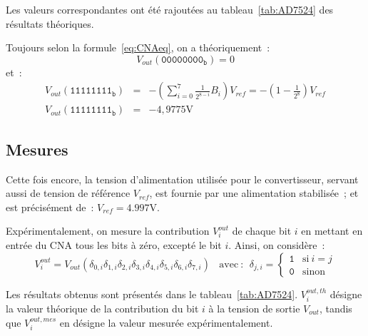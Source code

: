 \documentclass{article}
\begin{document}
Les valeurs correspondantes ont été rajoutées au tableau~\ref{tab:AD7524} des résultats théoriques.


Toujours selon la formule~\ref{eq:CNAeq}, on a théoriquement~:
\begin{equation*}
V_{out}(\mathtt{00000000_b}) = 0
\end{equation*}
et~:
\begin{eqnarray*}
V_{out}(\mathtt{11111111_b}) &=& -\left(\sum_{i=0}^{7}\frac{1}{2^{8-i}}B_i\right)V_{ref} = -(1-\frac{1}{2^8})V_{ref}\\
V_{out}(\mathtt{11111111_b}) &=& -4,9775\mathrm{V}
\end{eqnarray*}


\subsection{Mesures}


Cette fois encore, la tension d'alimentation utilisée pour le convertisseur, servant aussi de tension de référence $V_{ref}$, est fournie par une alimentation stabilisée~; et est précisément de~: ${V_{ref}=\mathrm{4.997 V}}$.



Expérimentalement, on mesure la contribution $V_i^{out}$ de chaque bit $i$ en mettant en entrée du CNA tous les bits à zéro, excepté le bit $i$. Ainsi, on considère~:
\begin{equation*}
V_i^{out} = V_{out}(\delta_{0,i}\delta_{1,i}\delta_{2,i}\delta_{3,i}\delta_{4,i}\delta_{5,i}\delta_{6,i}\delta_{7,i}) \mathrm{~~~~avec~:~~}\delta_{j,i} = \begin{cases} \mathtt{1} &\mathrm{si~} i=j \\ \mathtt{0} & \mbox{sinon}\end{cases}
\end{equation*}

Les résultats obtenus sont présentés dans le tableau~\ref{tab:AD7524}. $V_i^{out,th}$ désigne la valeur théorique de la contribution du bit $i$ à la tension de sortie $V_{out}$, tandis que $V_i^{out,mes}$ en désigne la valeur mesurée expérimentalement.
\end{document}
